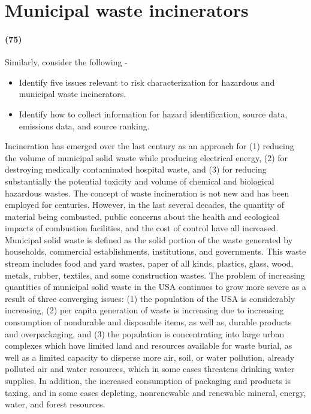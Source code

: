 \documentclass[11pt,a4paper]{article}
\begin{document}
\newpage         
        
\section{Municipal waste incinerators}
\paragraph*{(75)}
Similarly, consider the following - 
\begin{itemize}[topsep=-1ex,itemsep=-1ex,partopsep=1ex,parsep=1ex,font=\bfseries]
    \item Identify five issues relevant to risk characterization for hazardous and municipal waste incinerators.
    \item Identify how to collect information for hazard identification, source data, emissions data, and source ranking.
\end{itemize}
        
\noindent Incineration has emerged over the last century as an approach for (1) reducing the volume of municipal solid waste while producing electrical energy, (2) for destroying medically contaminated hospital waste, and (3) for reducing substantially the potential toxicity and volume of chemical and biological hazardous wastes. The concept of waste incineration is not new and has been employed for centuries. However, in the last several decades, the quantity of material being combusted, public concerns about the health and ecological impacts of combustion facilities, and the cost of control have all increased.\\

\noindent Municipal solid waste is defined as the solid portion of the waste generated by households, commercial establishments, institutions, and governments. This waste stream includes food and yard wastes, paper of all kinds, plastics, glass, wood, metals, rubber, textiles, and some construction wastes. The problem of increasing quantities of municipal solid waste in the USA continues to grow more severe as a result of three converging issues: (1) the population of the USA is considerably increasing, (2) per capita generation of waste is increasing due to increasing consumption of nondurable and disposable items, as well as, durable products and overpackaging, and (3) the population is concentrating into large urban complexes which have limited land and resources available for waste burial, as well as a limited capacity to disperse more air, soil, or water pollution, already polluted air and water resources, which in some cases threatens drinking water supplies. In addition, the increased consumption of packaging and products is taxing, and in some cases depleting, nonrenewable and renewable mineral, energy, water, and forest resources.  \\
\end{document}
